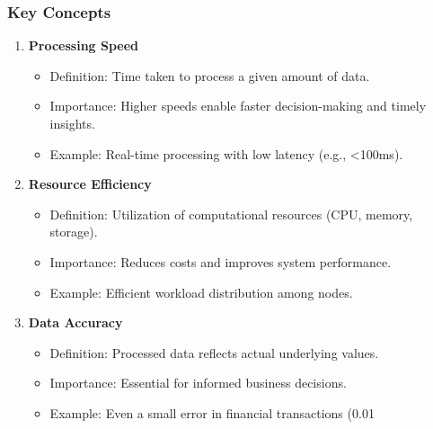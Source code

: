 \documentclass[aspectratio=169]{beamer}
\begin{document}
\begin{frame}[fragile]
    \frametitle{Key Concepts}
    \begin{enumerate}
        \item \textbf{Processing Speed}
            \begin{itemize}
                \item Definition: Time taken to process a given amount of data.
                \item Importance: Higher speeds enable faster decision-making and timely insights.
                \item Example: Real-time processing with low latency (e.g., <100ms).
            \end{itemize}
        
        \item \textbf{Resource Efficiency}
            \begin{itemize}
                \item Definition: Utilization of computational resources (CPU, memory, storage).
                \item Importance: Reduces costs and improves system performance.
                \item Example: Efficient workload distribution among nodes.
            \end{itemize}
        
        \item \textbf{Data Accuracy}
            \begin{itemize}
                \item Definition: Processed data reflects actual underlying values.
                \item Importance: Essential for informed business decisions.
                \item Example: Even a small error in financial transactions (0.01%
            \end{itemize}
    \end{enumerate}
\end{frame}
\end{document}
